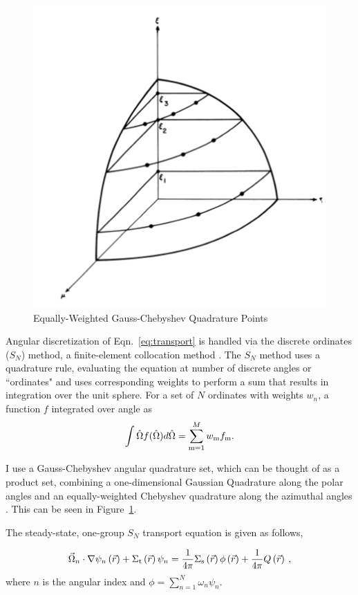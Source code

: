 \begin{figure}[H]
    \centering
    \includegraphics[width=.5\textwidth]{fig/SNPoints.png}
    \caption{Equally-Weighted Gauss-Chebyshev Quadrature Points \cite{Lathrop1965}}
    \label{fig:SN}
\end{figure}
%
Angular discretization of Eqn.~\eqref{eq:transport} is handled via the discrete ordinates ($S_N$) method, a finite-element collocation method \cite{Lathrop1965}. The $S_N$ method uses a quadrature rule, evaluating the equation at number of discrete angles or ``ordinates" and uses corresponding weights to perform a sum that results in integration over the unit sphere. 
For a set of $N$ ordinates with weights $w_n$, a function $f$ integrated over angle as
%
\begin{equation}

\int \hat{\Omega} f(\hat{\Omega}) d \hat{\Omega} = \sum\limits_{\mrm=1}^{M} w_\mrm f_\mrm.    

\end{equation}

I use a Gauss-Chebyshev angular quadrature set, which can be thought of as a product set, combining a one-dimensional Gaussian Quadrature along the polar angles and an equally-weighted Chebyshev quadrature along the azimuthal angles \cite{jarrel-thesis}. This can be seen in Figure~\ref{fig:SN}. 

The steady-state, one-group $S_N$ transport equation is given as follows,

 \begin{equation}
  \vec{\Omega}_n \cdot \nabla \psi_n \left(\vec{r}\right)+ \Sigma_{\mathrm{t}}\left(\vec{r}\right)\psi_n = \frac{1}{4 \pi} \Sigma_{\mathrm{s}}\left(\vec{r}\right) \phi\left(\vec{r}\right) + \frac{1}{4 \pi} Q\left(\vec{r}\right)\:,
  \label{eq:transport-angular}
 \end{equation}
where $n$ is the angular index and $\phi = \sum\limits_{n=1}^N \omega_n \psi_n$.


